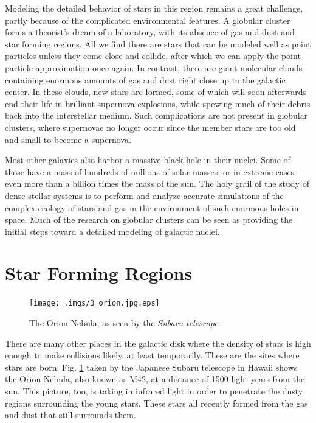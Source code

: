 \documentclass{book}
\begin{document}
Modeling the detailed behavior of stars in this region remains a great
challenge, partly because of the complicated environmental features.
A globular cluster forms a theorist's dream of a laboratory, with its
absence of gas and dust and star forming regions.  All we find there
are stars that can be modeled well as point particles unless they come
close and collide, after which we can apply the point particle
approximation once again.  In contrast, there are giant molecular
clouds containing enormous amounts of gas and dust right close up to
the galactic center.  In these clouds, new stars are formed, some of
which will soon afterwards end their life in brilliant supernova
explosions, while spewing much of their debris back into the
interstellar medium.  Such complications are not present in globular
clusters, where supernovae no longer occur since the member stars are
too old and small to become a supernova.

Most other galaxies also harbor a massive black hole in their nuclei.
Some of those have a mass of hundreds of millions of solar masses, or
in extreme cases even more than a billion times the mass of the sun.
The holy grail of the study of dense stellar systems is to perform and
analyze accurate simulations of the complex ecology of stars and gas
in the environment of such enormous holes in space.  Much of the
research on globular clusters can be seen as providing the initial
steps toward a detailed modeling of galactic nuclei.

\section{  Star Forming Regions}
\label{sect:8}


 
\begin{figure}
\begin{minipage}{\columnwidth}
\begin{center}
\renewcommand{\thefootnote}{\alph{footnote}}
    \texttt{[image: .imgs/3\_orion.jpg.eps]}
\caption{The Orion Nebula, as seen by the
 {\it Subaru telescope\protect \footnotemark[1]}.
}

\label{orion}
\end{center}
\end{minipage}
\end{figure}



There are many other places in the galactic disk where the density of
stars is high enough to make collisions likely, at least temporarily.
These are the sites where stars are born.  Fig. \ref{orion} taken by
the Japanese Subaru telescope in Hawaii shows the Orion Nebula, also
known as M42, at a distance of 1500 light years from the sun.  This
picture, too, is taking in infrared light in order to penetrate the
dusty regions surrounding the young stars.  These stars all recently
formed from the gas and dust that still surrounds them.
\end{document}
